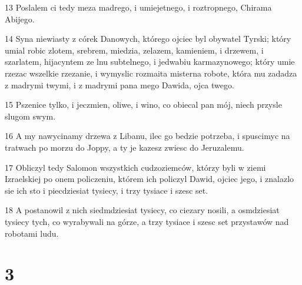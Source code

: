 \par 13 Poslalem ci tedy meza madrego, i umiejetnego, i roztropnego, Chirama Abijego.
\par 14 Syna niewiasty z córek Danowych, którego ojciec byl obywatel Tyrski; który umial robic zlotem, srebrem, miedzia, zelazem, kamieniem, i drzewem, i szarlatem, hijacyntem ze lnu subtelnego, i jedwabiu karmazynowego; który umie rzezac wszelkie rzezanie, i wymyslic rozmaita misterna robote, która mu zadadza z madrymi twymi, i z madrymi pana mego Dawida, ojca twego.
\par 15 Pszenice tylko, i jeczmien, oliwe, i wino, co obiecal pan mój, niech przysle slugom swym.
\par 16 A my nawycinamy drzewa z Libanu, ilec go bedzie potrzeba, i spuscimyc na tratwach po morzu do Joppy, a ty je kazesz zwiesc do Jeruzalemu.
\par 17 Obliczyl tedy Salomon wszystkich cudzoziemców, którzy byli w ziemi Izraelskiej po onem policzeniu, którem ich policzyl Dawid, ojciec jego, i znalazlo sie ich sto i piecdziesiat tysiecy, i trzy tysiace i szesc set.
\par 18 A postanowil z nich siedmdziesiat tysiecy, co ciezary nosili, a osmdziesiat tysiecy tych, co wyrabywali na górze, a trzy tysiace i szesc set przystawów nad robotami ludu.

\chapter{3}

